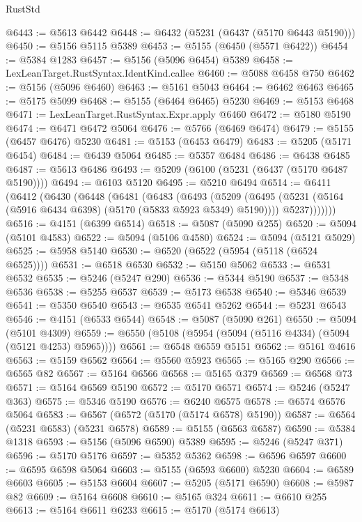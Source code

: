\begin{lexlean}{RustStd}
\begin{coremodule}
@6443 := @5613 @6442
@6448 := @6432 (@5231 (@6437 (@5170 @6443 @5190)))
@6450 := @5156 @5115 @5389
@6453 := @5155 (@6450 (@5571 @6422))
@6454 := @5384 @1283
@6457 := @5156 (@5096 @6454) @5389
@6458 := LexLeanTarget.RustSyntax.IdentKind.callee
@6460 := @5088 @6458 @750
@6462 := @5156 (@5096 @6460)
@6463 := @5161 @5043
@6464 := @6462 @6463
@6465 := @5175 @5099
@6468 := @5155 (@6464 @6465) @5230
@6469 := @5153 @6468
@6471 := LexLeanTarget.RustSyntax.Expr.apply @6460
@6472 := @5180 @5190
@6474 := @6471 @6472 @5064
@6476 := @5766 (@6469 @6474)
@6479 := @5155 (@6457 @6476) @5230
@6481 := @5153 (@6453 @6479)
@6483 := @5205 (@5171 @6454)
@6484 := @6439 @5064
@6485 := @5357 @6484
@6486 := @6438 @6485
@6487 := @5613 @6486
@6493 := @5209 (@6100 (@5231 (@6437 (@5170 @6487 @5190))))
@6494 := @6103 @5120
@6495 := @5210 @6494
@6514 := @6411
    (@6412
      (@6430
        (@6448
          (@6481
            (@6483
              (@6493
                (@5209
                  (@6495 (@5231 (@5164 (@5916 @6434 @6398) (@5170 (@5833 @5923 @5349) @5190))))
                  @5237)))))))
@6516 := @4151 (@6399 @6514)
@6518 := @5087 (@5090 @255)
@6520 := @5094 (@5101 @4583)
@6522 := @5094 (@5106 @4580)
@6524 := @5094 (@5121 @5029)
@6525 := @5958 @5140
@6530 := @6520 (@6522 (@5954 (@5118 (@6524 @6525))))
@6531 := @6518 @6530
@6532 := @5150 @5062
@6533 := @6531 @6532
@6535 := @5246 (@5247 @290)
@6536 := @5344 @5190
@6537 := @5348 @6536
@6538 := @5255 @6537
@6539 := @5173 @6538
@6540 := @5346 @6539
@6541 := @5350 @6540
@6543 := @6535 @6541 @5262
@6544 := @5231 @6543
@6546 := @4151 (@6533 @6544)
@6548 := @5087 (@5090 @261)
@6550 := @5094 (@5101 @4309)
@6559 := @6550 (@5108 (@5954 (@5094 (@5116 @4334) (@5094 (@5121 @4253) @5965))))
@6561 := @6548 @6559 @5151
@6562 := @5161 @4616
@6563 := @5159 @6562
@6564 := @5560 @5923
@6565 := @5165 @290
@6566 := @6565 @82
@6567 := @5164 @6566
@6568 := @5165 @379
@6569 := @6568 @73
@6571 := @5164 @6569 @5190
@6572 := @5170 @6571
@6574 := @5246 (@5247 @363)
@6575 := @5346 @5190
@6576 := @6240 @6575
@6578 := @6574 @6576 @5064
@6583 := @6567 (@6572 (@5170 (@5174 @6578) @5190))
@6587 := @6564 (@5231 @6583) (@5231 @6578)
@6589 := @5155 (@6563 @6587)
@6590 := @5384 @1318
@6593 := @5156 (@5096 @6590) @5389
@6595 := @5246 (@5247 @371)
@6596 := @5170 @5176
@6597 := @5352 @5362
@6598 := @6596 @6597
@6600 := @6595 @6598 @5064
@6603 := @5155 (@6593 @6600) @5230
@6604 := @6589 @6603
@6605 := @5153 @6604
@6607 := @5205 (@5171 @6590)
@6608 := @5987 @82
@6609 := @5164 @6608
@6610 := @5165 @324
@6611 := @6610 @255
@6613 := @5164 @6611 @6233
@6615 := @5170 (@5174 @6613)

\end{coremodule}
\end{lexlean}
